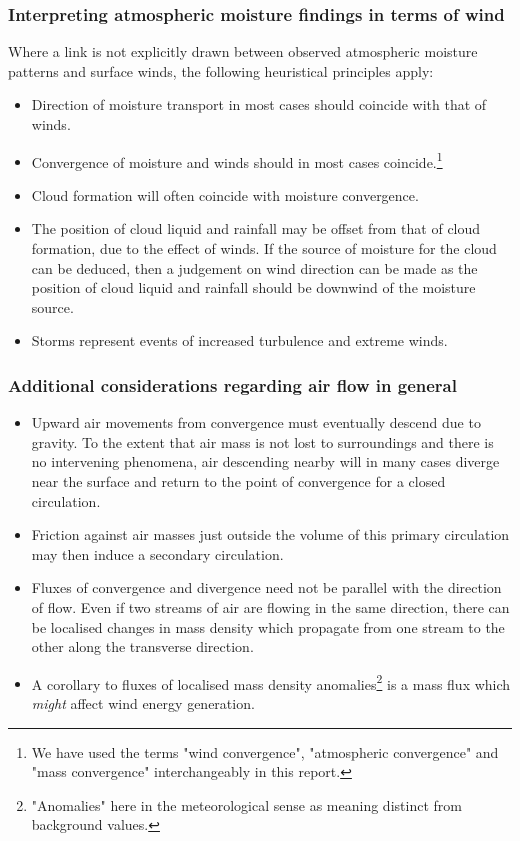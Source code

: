 \subsubsection{Interpreting atmospheric moisture findings in terms of wind}

Where a link is not explicitly drawn between observed atmospheric moisture patterns and surface winds, the following heuristical principles apply:

\begin{itemize}
	\item Direction of moisture transport in most cases should coincide with that of winds.
	\item Convergence of moisture and winds should in most cases coincide.\footnote{We have used the terms "wind convergence", "atmospheric convergence" and "mass convergence" interchangeably in this report.}
	\item Cloud formation will often coincide with moisture convergence.
	\item The position of cloud liquid and rainfall may be offset from that of cloud formation, due to the effect of winds. If the source of moisture for the cloud can be deduced, then a judgement on wind direction can be made as the position of cloud liquid and rainfall should be downwind of the moisture source.
	\item Storms represent events of increased turbulence and extreme winds.
\end{itemize}

\subsubsection{Additional considerations regarding air flow in general}

\begin{itemize}
	\item Upward air movements from convergence must eventually descend due to gravity. To the extent that air mass is not lost to surroundings and there is no intervening phenomena, air descending nearby will in many cases diverge near the surface and return to the point of convergence for a closed circulation.
	\item Friction against air masses just outside the volume of this primary circulation may then induce a secondary circulation.
	\item Fluxes of convergence and divergence need not be parallel with the direction of flow. Even if two streams of air are flowing in the same direction, there can be localised changes in mass density which propagate from one stream to the other along the transverse direction.
	\item A corollary to fluxes of localised mass density anomalies\footnote{"Anomalies" here in the meteorological sense as meaning distinct from background values.} is a mass flux which \textit{might} affect wind energy generation.
\end{itemize}
